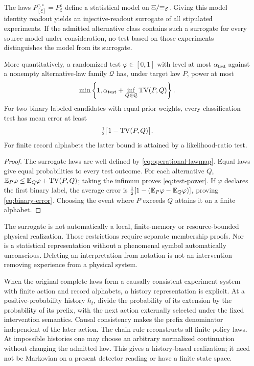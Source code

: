 \begin{theorem}\label{p2-28}
The laws \(P^{e,\circ}_{[\xi]}=P^e_\xi\) define a statistical model on \(\Xi/{\equiv_{\mathcal E}}\). Giving this model identity readout yields an injective-readout surrogate of all stipulated experiments. If the admitted alternative class contains such a surrogate for every source model under consideration, no test based on those experiments distinguishes the model from its surrogate.

More quantitatively, a randomized test \(\varphi\in[0,1]\) with level at most \(\alpha_{\mathrm{test}}\) against a nonempty alternative-law family \(\mathcal Q\) has, under target law \(P\), power at most
\begin{equation}\label{eq:test-power}
 \min\left\{1,\alpha_{\mathrm{test}}+\inf_{Q\in\mathcal Q}\operatorname{TV}(P,Q)\right\}.
\end{equation}
For two binary-labeled candidates with equal prior weights, every classification test has mean error at least
\begin{equation}\label{eq:binary-error}
 \tfrac12\bigl[1-\operatorname{TV}(P,Q)\bigr].
\end{equation}
For finite record alphabets the latter bound is attained by a likelihood-ratio test.
\end{theorem}
\begin{proof}
The surrogate laws are well defined by \cref{eq:operational-lawmap}. Equal laws give equal probabilities to every test outcome. For each alternative \(Q\),
\(\mathbb E_P\varphi\le\mathbb E_Q\varphi+\operatorname{TV}(P,Q)\); taking the infimum proves \cref{eq:test-power}. If \(\varphi\) declares the first binary label, the average error is
\(\tfrac12[1-(\mathbb E_P\varphi-\mathbb E_Q\varphi)]\), proving \cref{eq:binary-error}. Choosing the event where \(P\) exceeds \(Q\) attains it on a finite alphabet.
\end{proof}
The surrogate is not automatically a local, finite-memory or resource-bounded physical realization. Those restrictions require separate membership proofs. Nor is a statistical representation without a phenomenal symbol automatically unconscious. Deleting an interpretation from notation is not an intervention removing experience from a physical system.

When the original complete laws form a causally consistent experiment system with finite action and record alphabets, a history representation is explicit. At a positive-probability history \(h_t\), divide the probability of its extension by the probability of its prefix, with the next action externally selected under the fixed intervention semantics. Causal consistency makes the prefix denominator independent of the later action. The chain rule reconstructs all finite policy laws. At impossible histories one may choose an arbitrary normalized continuation without changing the admitted law. This gives a history-based realization; it need not be Markovian on a present detector reading or have a finite state space.

